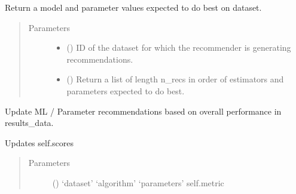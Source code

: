 \documentclass[letterpaper,10pt,english]{sphinxmanual}
\begin{document}
\begin{fulllineitems}
\begin{fulllineitems}
\label{\detokenize{index:ai.recommender.average_recommender.AverageRecommender.recommend}}
Return a model and parameter values expected to do best on dataset.
\begin{quote}\begin{description}
\item[{Parameters}] \leavevmode\begin{itemize}
\item {} 
 () \textendash{} ID of the dataset for which the recommender is generating recommendations.

\item {} 
 (\sphinxstyleliteralemphasis{\sphinxupquote{ (}}\sphinxstyleliteralemphasis{\sphinxupquote{)}}\sphinxstyleliteralemphasis{\sphinxupquote{, }}) \textendash{} Return a list of length n\_recs in order of estimators and parameters expected to do best.

\end{itemize}

\end{description}\end{quote}

\end{fulllineitems}


\begin{fulllineitems}
\label{\detokenize{index:ai.recommender.average_recommender.AverageRecommender.update}}
Update ML / Parameter recommendations based on overall performance in results\_data.

Updates self.scores
\begin{quote}\begin{description}
\item[{Parameters}] \leavevmode
{} () \textendash{} ‘dataset’
‘algorithm’
‘parameters’
self.metric

\end{description}\end{quote}

\end{fulllineitems}


\end{fulllineitems}
\end{document}
